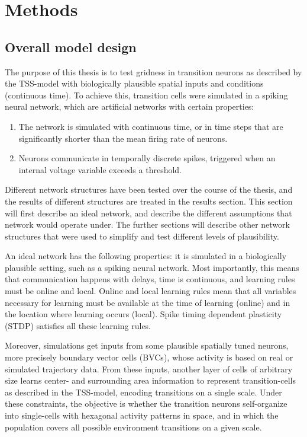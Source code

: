 \documentclass{article}
\begin{document}
    \section{Methods} 
    \subsection{Overall model design}
    The purpose of this thesis is to test gridness in transition neurons as described by the TSS-model with biologically plausible spatial inputs and conditions (continuous time). To achieve this, transition cells were simulated in a spiking neural network, which are artificial networks with certain properties:
    \begin{enumerate}
        \item The network is simulated with continuous time, or in time steps that are significantly shorter than the mean firing rate of neurons.
        \item Neurons communicate in temporally discrete spikes, triggered when an internal voltage variable exceeds a threshold.
    \end{enumerate}
    
    Different network structures have been tested over the course of the thesis, and the results of different structures are treated in the results section. This section will first describe an ideal network, and describe the different assumptions that network would operate under. The further sections will describe other network structures that were used to simplify and test different levels of plausibility.

    An ideal network has the following properties: it is simulated in a biologically plausible setting, such as a spiking neural network. Most importantly, this means that communication happens with delays, time is continuous, and learning rules must be online and local. Online and local learning rules mean that all variables necessary for learning must be available at the time of learning (online) and in the location where learning occurs (local). Spike timing dependent plasticity (STDP) satisfies all these learning rules.
    
    Moreover, simulations get inputs from some plausible spatially tuned neurons, more precisely boundary vector cells (BVCs), whose activity is based on real or simulated trajectory data. From these inputs, another layer of cells of arbitrary size learns center- and surrounding area information to represent transition-cells as described in the TSS-model, encoding transitions on a single scale. Under these constraints, the objective is whether the transition neurons self-organize into single-cells with hexagonal activity patterns in space, and in which the population covers all possible environment transitions on a given scale.
\end{document}

